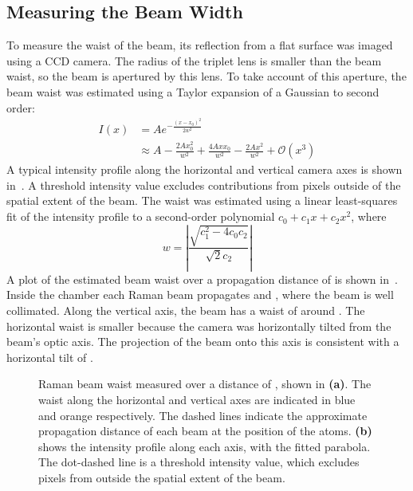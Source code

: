 \subsection{Measuring the Beam Width}
To measure the waist of the beam, its reflection from a flat surface was imaged
using a CCD camera. The radius of the triplet lens is smaller than the beam
waist, so the beam is apertured by this lens. To take account of this aperture,
the beam waist was estimated using a Taylor expansion of a Gaussian to second
order:
\begin{align}
	I(x) & = A e^{-\frac{(x-x_0)^2}{2 w^2}} \nonumber                                                                              \\
	     & \approx A-\frac{2 A x_0^2}{w^2}+\frac{4 A x x_0}{w^2}-\frac{2 A x^2}{w^2} + \mathcal{O}(x^3) \label{eq:gaussian_approx}
\end{align}
A typical intensity profile along the horizontal and vertical camera axes is
shown in~. A threshold intensity value excludes
contributions from pixels outside of the spatial extent of the beam. The waist
was estimated using a linear least-squares fit of the intensity profile to a
second-order polynomial \(c_0 + c_1 x + c_2 x^2\), where \begin{equation} w =
\left|\frac{\sqrt{c_1^2-4c_0 c_2}}{\sqrt{2}c_2} \right| \end{equation} A plot of
the estimated beam waist over a propagation distance of  is
shown in~. Inside the chamber each Raman beam
propagates  and , where
the beam is well collimated. Along the vertical axis, the beam has a waist of
around . The horizontal waist is smaller because the
camera was horizontally tilted from the beam's optic axis. The projection of the
beam onto this axis is consistent with a horizontal tilt of
.  \begin{figure} \centering
	\def\svgwidth{\columnwidth}
	\caption[Measured Raman beam waist]{Raman beam waist measured over a distance
		of , shown in \textbf{(a)}. The waist along the
		horizontal and vertical axes are indicated in blue and orange respectively.
		The dashed lines indicate the approximate propagation distance of each beam
		at the position of the atoms. \textbf{(b)} shows the intensity profile along
		each axis, with the fitted parabola. The dot-dashed line is a threshold
		intensity value, which excludes pixels from outside the spatial extent of
		the beam.} 
  \label{fig:beam_waist_plots} 
\end{figure}
